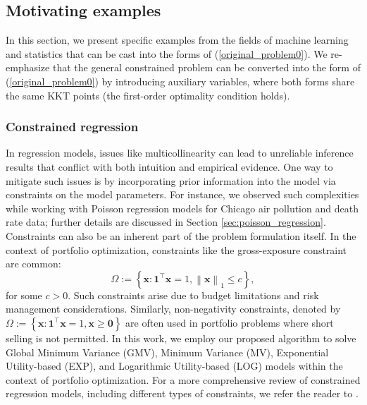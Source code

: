 \documentclass[aos]{imsart}
\numberwithin{equation}{section}
\theoremstyle{plain}
\begin{document}
\subsection{Motivating examples}
In this section, we present specific examples from the fields of machine learning and statistics that can be cast into the forms of (\ref{original_problem0}). We re-emphasize that the general constrained problem can be converted into the form of (\ref{original_problem0}) by introducing auxiliary variables, where both forms share the same KKT points (the first-order optimality condition holds). 

\subsubsection{Constrained regression}
\label{sec_constrained_regression}
In regression models, issues like multicollinearity can lead to unreliable inference results that conflict with both intuition and empirical evidence. One way to mitigate such issues is by incorporating prior information into the model via constraints on the model parameters.
For instance, we observed such complexities while working with Poisson regression models for Chicago air pollution and death rate data; further details are discussed in Section \ref{sec:poisson_regression}.
Constraints can also be an inherent part of the problem formulation itself.
In the context of portfolio optimization, constraints like the gross-exposure constraint \cite{fan2012vast} are common:
\begin{equation*}
    \Omega := \left\{\bm{x}: \bm{1}^{\top} \bm{x} = 1, \left\| \bm{x} \right\|_1 \leq c\right\},
\end{equation*}
for some $c > 0$. Such constraints arise due to budget limitations and risk management considerations.
Similarly, non-negativity constraints, denoted by $\Omega := \left\{\bm{x}: \bm{1}^{\top} \bm{x} = 1, \bm{x} \geq \bm{0}\right\}$ are often used in portfolio problems where short selling is not permitted. 
In this work, we employ our proposed algorithm to solve Global Minimum Variance (GMV), Minimum Variance (MV), Exponential Utility-based (EXP), and Logarithmic Utility-based (LOG) models within the context of portfolio optimization. For a more comprehensive review of constrained regression models, including different types of constraints, we refer the reader to \cite{fan2012vast, shapiro2000asymptotics, du2023high, sen1979asymptotic, na2021high, dupacova1988asymptotic, na2019high}.
\end{document}
